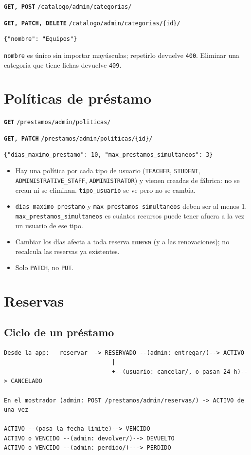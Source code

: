 \documentclass[11pt]{article}
\newcommand{\us}{\_\allowbreak}
\newcommand{\metodo}[2]{\textbf{\texttt{#1}} \texttt{#2}}
\begin{document}
\metodo{GET, POST}{/catalogo/admin/categorias/}

\metodo{GET, PATCH, DELETE}{/catalogo/admin/categorias/\{id\}/}
\begin{lstlisting}
{"nombre": "Equipos"}
\end{lstlisting}
\texttt{nombre} es \'unico sin importar may\'usculas; repetirlo devuelve \texttt{400}. Eliminar una categor\'ia que tiene fichas devuelve \texttt{409}.

\section{Pol\'iticas de pr\'estamo}

\metodo{GET}{/prestamos/admin/politicas/}

\metodo{GET, PATCH}{/prestamos/admin/politicas/\{id\}/}
\begin{lstlisting}
{"dias_maximo_prestamo": 10, "max_prestamos_simultaneos": 3}
\end{lstlisting}
\begin{itemize}
    \item Hay una pol\'itica por cada tipo de usuario (\texttt{TEACHER}, \texttt{STUDENT}, \texttt{ADMINISTRATIVE\us STAFF}, \texttt{ADMINISTRATOR}) y vienen creadas de f\'abrica: no se crean ni se eliminan. \texttt{tipo\us usuario} se ve pero no se cambia.
    \item \texttt{dias\us maximo\us prestamo} y \texttt{max\us prestamos\us simultaneos} deben ser al menos 1. \texttt{max\us prestamos\us simultaneos} es cu\'antos recursos puede tener afuera a la vez un usuario de ese tipo.
    \item Cambiar los d\'ias afecta a toda reserva \textbf{nueva} (y a las renovaciones); no recalcula las reservas ya existentes.
    \item Solo \texttt{PATCH}, no \texttt{PUT}.
\end{itemize}

\section{Reservas}

\subsection*{Ciclo de un pr\'estamo}
\begin{lstlisting}
Desde la app:   reservar  -> RESERVADO --(admin: entregar/)--> ACTIVO
                               |
                               +--(usuario: cancelar/, o pasan 24 h)--> CANCELADO

En el mostrador (admin: POST /prestamos/admin/reservas/) -> ACTIVO de una vez

ACTIVO --(pasa la fecha limite)--> VENCIDO
ACTIVO o VENCIDO --(admin: devolver/)--> DEVUELTO
ACTIVO o VENCIDO --(admin: perdido/)---> PERDIDO
\end{lstlisting}
\end{document}
